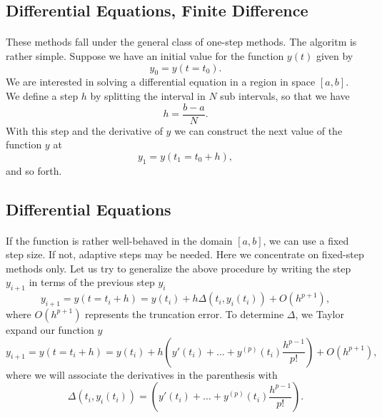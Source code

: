 \documentclass[%
oneside,                 %
final,                   %
10pt]{article}
\begin{document}
\subsection{Differential Equations, Finite Difference}

\paragraph{}
These methods fall under the general class of one-step methods.
The algoritm is rather simple. 
Suppose we have an initial value for the function $y(t)$ given by
\begin{equation}
  y_0=y(t=t_0).
\end{equation}
We are interested in solving a differential equation in a region
in space $[a,b]$. We define a step $h$ by splitting the interval
in $N$ sub intervals, so that we have
\begin{equation}
  h=\frac{b-a}{N}.
\end{equation}
With this step and the derivative of $y$ we can construct the
next value of the function $y$ at
\begin{equation}
   y_1=y(t_1=t_0+h),
\end{equation}
and so forth.




\subsection{Differential Equations}

\paragraph{}
If the function is rather well-behaved in the domain
$[a,b]$, we can use a fixed step size. If not, adaptive steps 
may be needed. Here we concentrate on fixed-step
methods only. 
Let us try to generalize the above procedure by writing the 
step $y_{i+1}$ in terms of the previous step $y_i$
\begin{equation}
  y_{i+1}=y(t=t_i+h)=y(t_i) + h\Delta(t_i,y_i(t_i)) + O(h^{p+1}),
\end{equation}
where $O(h^{p+1})$ represents the truncation error. To determine 
$\Delta$, we Taylor expand our function $y$
\begin{equation}
     y_{i+1}=y(t=t_i+h)=y(t_i) + h(y'(t_i)+\dots +y^{(p)}(t_i)\frac{h^{p-1}}{p!}) + O(h^{p+1}), \label{eq:taylor}
\end{equation}
where we will associate the derivatives in the parenthesis with
\begin{equation}
\Delta(t_i,y_i(t_i))=(y'(t_i)+\dots +y^{(p)}(t_i)\frac{h^{p-1}}{p!}). \label{eq:delta}
\end{equation}
\end{document}
